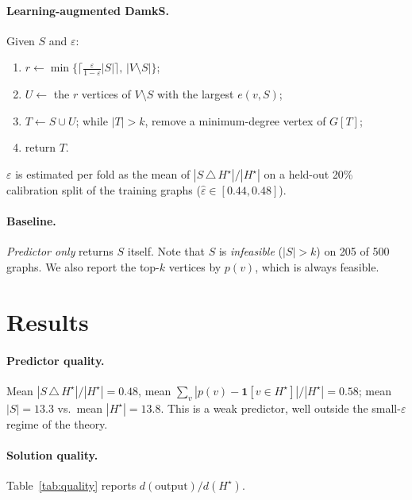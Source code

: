 \documentclass[11pt]{article}
\begin{document}
\paragraph{Learning-augmented DamkS.} Given $S$ and $\varepsilon$:
\begin{enumerate}
  \item $r \leftarrow \min\{\lceil \tfrac{\varepsilon}{1-\varepsilon}|S|\rceil,\, |V\setminus S|\}$;
  \item $U \leftarrow$ the $r$ vertices of $V\setminus S$ with the largest $e(v,S)$;
  \item $T \leftarrow S\cup U$; while $|T|>k$, remove a minimum-degree vertex of $G[T]$;
  \item return $T$.
\end{enumerate}
$\varepsilon$ is estimated per fold as the mean of $|S\,\triangle\,H^\star|/|H^\star|$ on a
held-out 20\% calibration split of the training graphs ($\hat\varepsilon \in [0.44, 0.48]$).

\paragraph{Baseline.} \emph{Predictor only} returns $S$ itself. Note that $S$ is
\emph{infeasible} ($|S|>k$) on 205 of 500 graphs. We also report the top-$k$ vertices by $p(v)$,
which is always feasible.

\section{Results}

\paragraph{Predictor quality.} Mean $|S\,\triangle\,H^\star|/|H^\star| = 0.48$, mean
$\sum_v|p(v)-\mathbf{1}[v\in H^\star]|/|H^\star| = 0.58$; mean $|S|=13.3$ vs.\ mean $|H^\star|=13.8$.
This is a weak predictor, well outside the small-$\varepsilon$ regime of the theory.

\paragraph{Solution quality.} Table~\ref{tab:quality} reports $d(\text{output})/d(H^\star)$.
\end{document}
